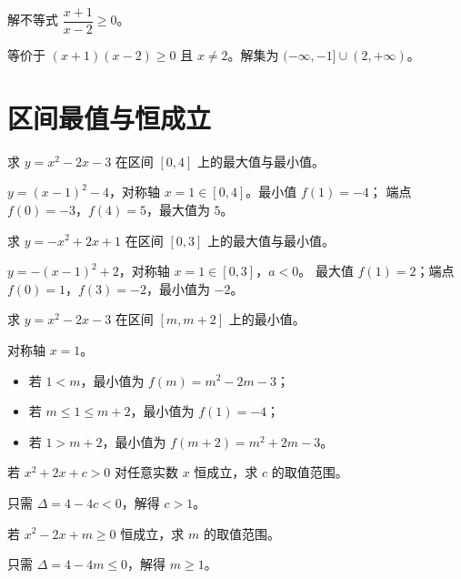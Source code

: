 \begin{problem}
解不等式 $\dfrac{x+1}{x-2}\geq0$。
\end{problem}
\begin{solution}
等价于 $(x+1)(x-2)\geq0$ 且 $x\neq2$。解集为 $(-\infty,-1]\cup(2,+\infty)$。
\end{solution}

\section{区间最值与恒成立}

\begin{problem}
求 $y=x^2-2x-3$ 在区间 $[0,4]$ 上的最大值与最小值。
\end{problem}
\begin{solution}
$y=(x-1)^2-4$，对称轴 $x=1\in[0,4]$。最小值 $f(1)=-4$；
端点 $f(0)=-3$，$f(4)=5$，最大值为 $5$。
\end{solution}

\begin{problem}
求 $y=-x^2+2x+1$ 在区间 $[0,3]$ 上的最大值与最小值。
\end{problem}
\begin{solution}
$y=-(x-1)^2+2$，对称轴 $x=1\in[0,3]$，$a<0$。
最大值 $f(1)=2$；端点 $f(0)=1$，$f(3)=-2$，最小值为 $-2$。
\end{solution}

\begin{problem}
求 $y=x^2-2x-3$ 在区间 $[m,m+2]$ 上的最小值。
\end{problem}
\begin{solution}
对称轴 $x=1$。
\begin{itemize}
  \item 若 $1<m$，最小值为 $f(m)=m^2-2m-3$；
  \item 若 $m\leq1\leq m+2$，最小值为 $f(1)=-4$；
  \item 若 $1>m+2$，最小值为 $f(m+2)=m^2+2m-3$。
\end{itemize}
\end{solution}

\begin{problem}
若 $x^2+2x+c>0$ 对任意实数 $x$ 恒成立，求 $c$ 的取值范围。
\end{problem}
\begin{solution}
只需 $\Delta=4-4c<0$，解得 $c>1$。
\end{solution}

\begin{problem}
若 $x^2-2x+m\geq0$ 恒成立，求 $m$ 的取值范围。
\end{problem}
\begin{solution}
只需 $\Delta=4-4m\leq0$，解得 $m\geq1$。
\end{solution}

